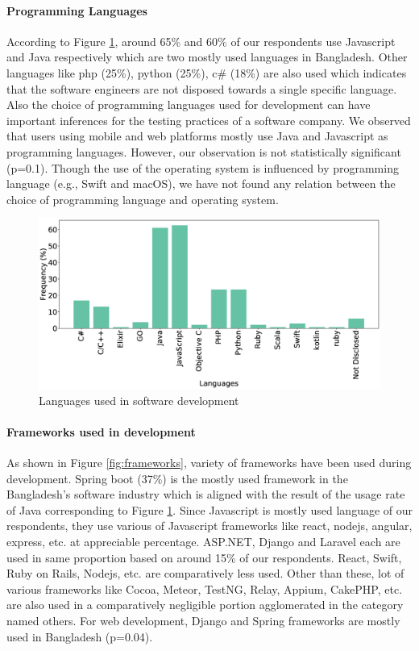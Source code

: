 \paragraph{Programming Languages}
According to Figure \ref{fig:languages}, around 65\% and 60\% of our respondents use Javascript and Java respectively which are two mostly used languages in Bangladesh. Other languages like php (25\%), python (25\%), c\# (18\%) are also used which indicates that the software engineers are not disposed towards a single specific language. Also the choice of programming languages used for development can have important inferences for the testing practices of a software company. We observed that users using mobile and web platforms mostly use Java and Javascript as programming languages. However, our observation is not statistically significant (p=0.1). Though the use of the operating system is influenced by programming language (e.g., Swift and macOS), we have not found any relation between the choice of programming language and operating system.

\begin{figure}[h]
\centering
  \includegraphics[scale=0.18]{Figures/Respondents_languages}
  \caption{Languages used in software development}
  \label{fig:languages}
\end{figure}

\paragraph{Frameworks used in development}
As shown in Figure \ref{fig:frameworks}, variety of frameworks have been used during development. Spring boot (37\%) is the mostly used framework in the Bangladesh's software industry which is aligned with the result of the usage rate of Java corresponding to Figure \ref{fig:languages}. Since Javascript is mostly used language of our respondents, they use various of Javascript frameworks like react, nodejs, angular, express, etc. at appreciable percentage. ASP.NET, Django and Laravel each are used in same proportion based on around 15\% of our respondents. React, Swift, Ruby on Rails, Nodejs, etc. are comparatively less used. Other than these, lot of various frameworks like Cocoa, Meteor, TestNG, Relay, Appium, CakePHP, etc. are also used in a comparatively negligible portion agglomerated in the category named others. For web development, Django and Spring frameworks are mostly used in Bangladesh (p=0.04).

